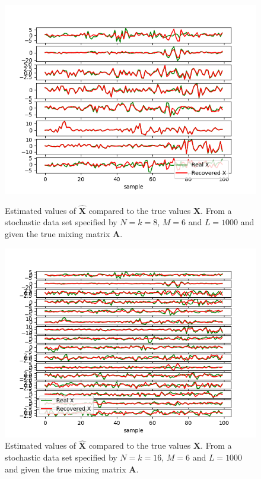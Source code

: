 \begin{figure}[H]
\begin{widepage}
    \begin{minipage}[t]{.45\textwidth}
    	\centering
		\includegraphics[scale=0.5]{figures/ch_6/M-SBL_AR1.png}
		\caption{Estimated values of $\hat{\mathbf{X}}$ compared to the true values $\mathbf{X}$. From a stochastic data set specified by $N = k = 8$, $M = 6$ and $L=1000$ and given the true mixing matrix $\mathbf{A}$.}
		\label{fig:AR1}
    \end{minipage} 
    \hfill
    \begin{minipage}[t]{.45\textwidth}
        \centering
		\includegraphics[scale=0.5]{figures/ch_6/M-SBL_AR2.png}
		\caption{Estimated values of $\hat{\mathbf{X}}$ compared to the true 					values $\mathbf{X}$. From a stochastic data set specified by $N = k = 16$, $M = 6$ and $L=1000$ and given the true mixing matrix $\mathbf{A}$.}
		\label{fig:AR2}
    \end{minipage}
\end{widepage}
\end{figure}

